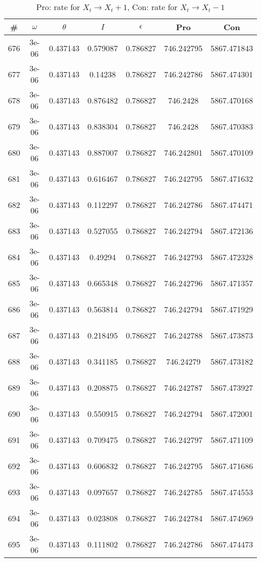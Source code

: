 \newpage
\begin{table}
\caption{Pro: rate for $X_t \rightarrow X_t + 1$, Con: rate for $X_t \rightarrow X_t - 1$}
\begin{tabular*}{\linewidth}{c|c|c|c|c|c|c}
\# & $\omega$ & $\theta$ & $I$ & $\epsilon$ & Pro & Con \\
\hline
676 & 3e-06 & 0.437143 & 0.579087 & 0.786827 & 746.242795 & 5867.471843\\
677 & 3e-06 & 0.437143 & 0.14238 & 0.786827 & 746.242786 & 5867.474301\\
678 & 3e-06 & 0.437143 & 0.876482 & 0.786827 & 746.2428 & 5867.470168\\
679 & 3e-06 & 0.437143 & 0.838304 & 0.786827 & 746.2428 & 5867.470383\\
680 & 3e-06 & 0.437143 & 0.887007 & 0.786827 & 746.242801 & 5867.470109\\
681 & 3e-06 & 0.437143 & 0.616467 & 0.786827 & 746.242795 & 5867.471632\\
682 & 3e-06 & 0.437143 & 0.112297 & 0.786827 & 746.242786 & 5867.474471\\
683 & 3e-06 & 0.437143 & 0.527055 & 0.786827 & 746.242794 & 5867.472136\\
684 & 3e-06 & 0.437143 & 0.49294 & 0.786827 & 746.242793 & 5867.472328\\
685 & 3e-06 & 0.437143 & 0.665348 & 0.786827 & 746.242796 & 5867.471357\\
686 & 3e-06 & 0.437143 & 0.563814 & 0.786827 & 746.242794 & 5867.471929\\
687 & 3e-06 & 0.437143 & 0.218495 & 0.786827 & 746.242788 & 5867.473873\\
688 & 3e-06 & 0.437143 & 0.341185 & 0.786827 & 746.24279 & 5867.473182\\
689 & 3e-06 & 0.437143 & 0.208875 & 0.786827 & 746.242787 & 5867.473927\\
690 & 3e-06 & 0.437143 & 0.550915 & 0.786827 & 746.242794 & 5867.472001\\
691 & 3e-06 & 0.437143 & 0.709475 & 0.786827 & 746.242797 & 5867.471109\\
692 & 3e-06 & 0.437143 & 0.606832 & 0.786827 & 746.242795 & 5867.471686\\
693 & 3e-06 & 0.437143 & 0.097657 & 0.786827 & 746.242785 & 5867.474553\\
694 & 3e-06 & 0.437143 & 0.023808 & 0.786827 & 746.242784 & 5867.474969\\
695 & 3e-06 & 0.437143 & 0.111802 & 0.786827 & 746.242786 & 5867.474473\\

\end{tabular*}
\end{table}
